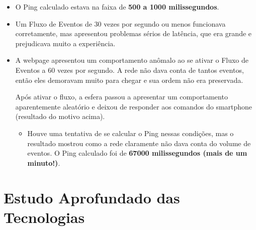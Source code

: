 \documentclass[a4paper,12pt]{article}
\begin{document}
\begin{itemize}

    \item O Ping calculado estava na faixa de \textbf{500 a 1000 milissegundos}.

    \item Um Fluxo de Eventos de 30 vezes por segundo ou menos funcionava corretamente, mas apresentou problemas sérios de latência, que era grande e prejudicava muito a experiência.

    \item A webpage apresentou um comportamento anômalo ao se ativar o Fluxo de Eventos a 60 vezes por segundo. A rede não dava conta de tantos eventos, então eles demoravam muito para chegar e sua ordem não era preservada.

    Após ativar o fluxo, a esfera passou a apresentar um comportamento aparentemente aleatório e deixou de responder aos comandos do smartphone (resultado do motivo acima).

    \begin{itemize}

        \item Houve uma tentativa de se calcular o Ping nessas condições, mas o resultado mostrou como a rede claramente não dava conta do volume de eventos. O Ping calculado foi de \textbf{67000 milissegundos (mais de um minuto!)}.

    \end{itemize}

\end{itemize}










%
%








\newpage

\section{Estudo Aprofundado das Tecnologias}
\end{document}
